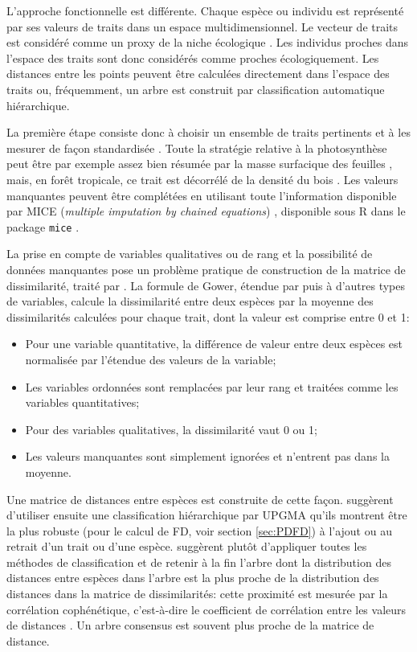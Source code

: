 \documentclass[
  11pt,
  french,
  a4paper,
  extrafontsizes,onecolumn,openright
  ]{memoir}
\providecommand{\tightlist}{%
  \setlength{\itemsep}{0pt}\setlength{\parskip}{0pt}}
\begin{document}
L'approche fonctionnelle est différente.
Chaque espèce ou individu est représenté par ses valeurs de traits dans un espace multidimensionnel.
Le vecteur de traits est considéré comme un proxy de la niche écologique \autocite{Westoby2002}.
Les individus proches dans l'espace des traits sont donc considérés comme proches écologiquement.
Les distances entre les points peuvent être calculées directement dans l'espace des traits ou, fréquemment, un arbre est construit par classification automatique hiérarchique.

La première étape consiste donc à choisir un ensemble de traits pertinents et à les mesurer de façon standardisée \autocite{Cornelissen2003}.
Toute la stratégie relative à la photosynthèse peut être par exemple assez bien résumée par la masse surfacique des feuilles \autocite{Wright2004}, mais, en forêt tropicale, ce trait est décorrélé de la densité du bois \autocite{Baraloto2010}.
Les valeurs manquantes peuvent être complétées en utilisant toute l'information disponible par MICE (\emph{multiple imputation by chained equations}) \autocite{VanBuuren2006}, disponible sous R dans le package \texttt{mice} \autocite{VanBuuren2011}.

La prise en compte de variables qualitatives ou de rang et la possibilité de données manquantes pose un problème pratique de construction de la matrice de dissimilarité, traité par \textcite{Gower1971}.
La formule de Gower, étendue par \textcite{Podani1999} puis \textcite{Pavoine2009b} à d'autres types de variables, calcule la dissimilarité entre deux espèces par la moyenne des dissimilarités calculées pour chaque trait, dont la valeur est comprise entre 0 et 1:

\begin{itemize}
\tightlist
\item
  Pour une variable quantitative, la différence de valeur entre deux espèces est normalisée par l'étendue des valeurs de la variable;
\item
  Les variables ordonnées sont remplacées par leur rang et traitées comme les variables quantitatives;
\item
  Pour des variables qualitatives, la dissimilarité vaut 0 ou 1;
\item
  Les valeurs manquantes sont simplement ignorées et n'entrent pas dans la moyenne.
\end{itemize}

Une matrice de distances entre espèces est construite de cette façon.
\textcite{Podani2006} suggèrent d'utiliser ensuite une classification hiérarchique par UPGMA \autocite{Sokal1958} qu'ils montrent être la plus robuste (pour le calcul de FD, voir section \ref{sec:PDFD}) à l'ajout ou au retrait d'un trait ou d'une espèce.
\textcite{Mouchet2008} suggèrent plutôt d'appliquer toutes les méthodes de classification et de retenir à la fin l'arbre dont la distribution des distances entre espèces dans l'arbre est la plus proche de la distribution des distances dans la matrice de dissimilarités: cette proximité est mesurée par la corrélation cophénétique, c'est-à-dire le coefficient de corrélation entre les valeurs de distances \autocite{Sokal1962,Legendre2012}.
Un arbre consensus \autocite{Felsenstein2004} est souvent plus proche de la matrice de distance.
\end{document}
